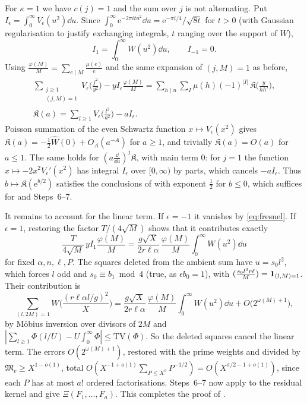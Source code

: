 \documentclass[11pt,colorlinks]{charlie}
\newcommand{\e}{\mathrm{e}}
\begin{document}
For $\kappa=1$ we have $c(j)=1$ and the sum over $j$ is not alternating. Put $I_\epsilon=\int_0^\infty V_\epsilon(u^2)\dd u$. Since $\int_0^\infty\e^{-2\pi i tu^2}\dd u=\e^{-\pi i/4}/\sqrt{8t}$ for $t>0$ (with Gaussian regularisation to justify exchanging integrals, $t$ ranging over the support of $W$),
\begin{equation}\label{eq:fresnel}
 I_1=\int_0^\infty W(u^2)\dd u,\qquad I_{-1}=0 .
\end{equation}
Using $\frac{\varphi(M)}M=\sum_{e\mid M}\frac{\mu(e)}e$ and the same expansion of $(j,M)=1$ as before,
\begin{gather*}
 \sum_{\substack{j\ge1\\(j,M)=1}}V_\epsilon\Big(\frac{j^2}{y^2}\Big)-yI_\epsilon\frac{\varphi(M)}M=\sum_{h\mid n}\sum_{I}\mu(h)(-1)^{|I|}\,\mathfrak K\Big(\frac y{hh'}\Big),\\
 \mathfrak K(a)=\sum_{l\ge1}V_\epsilon\Big(\frac{l^2}{a^2}\Big)-aI_\epsilon .
\end{gather*}
Poisson summation of the even Schwartz function $x\mapsto V_\epsilon(x^2)$ gives $\mathfrak K(a)=-\frac12\widehat W(0)+O_A(a^{-A})$ for $a\ge1$, and trivially $\mathfrak K(a)=O(a)$ for $a\le1$. The same holds for $(a\frac{\dd}{\dd a})^j\mathfrak K$, with main term $0$: for $j=1$ the function $x\mapsto-2x^2V_\epsilon'(x^2)$ has integral $I_\epsilon$ over $[0,\infty)$ by parts, which cancels $-aI_\epsilon$. Thus $b\mapsto\mathfrak K(\e^{b/2})$ satisfies the conclusions of  with exponent $\frac12$ for $b\le0$, which suffices for  and Steps~6--7.

It remains to account for the linear term. If $\epsilon=-1$ it vanishes by \eqref{eq:fresnel}. If $\epsilon=1$, restoring the factor $T/(4\sqrt M)$ shows that it contributes exactly
\[
 \frac{T}{4\sqrt M}\,yI_1\frac{\varphi(M)}M=\frac{g\sqrt X}{2r\ell\alpha}\,\frac{\varphi(M)}M\int_0^\infty W(u^2)\dd u
\]
for fixed $\alpha,n,\ell,P$. The squares deleted from the ambient sum have $u=s_0l^2$, which forces $l$ odd and $s_0\equiv b_1\bmod4$ (true, as $\epsilon b_0=1$), with $(\tfrac{s_0l^2r\ell}M)=\mathbf{1}_{(l,M)=1}$. Their contribution is
\[
 \sum_{(l,2M)=1}W\Big(\frac{(r\ell\alpha l/g)^2}X\Big)=\frac{g\sqrt X}{2r\ell\alpha}\,\frac{\varphi(M)}M\int_0^\infty W(u^2)\dd u+O\big(2^{\omega(M)+1}\big),
\]
by M\"obius inversion over divisors of $2M$ and $|\sum_{l\ge1}\Phi(l/U)-U\int_0^\infty\Phi|\le\mathrm{TV}(\Phi)$. So the deleted squares cancel the linear term. The errors $O(2^{\omega(M)+1})$, restored with the prime weights and divided by $\mathfrak M_v\ge X^{1-o(1)}$, total $O(X^{-1+o(1)}\sum_{P\le X^\sigma}P^{-1/2})=O(X^{\sigma/2-1+o(1)})$, since each $P$ has at most $a!$ ordered factorisations. Steps~6--7 now apply to the residual kernel and give $\Xi(F_1,\dots,F_a)$. This completes the proof of .
\end{document}
